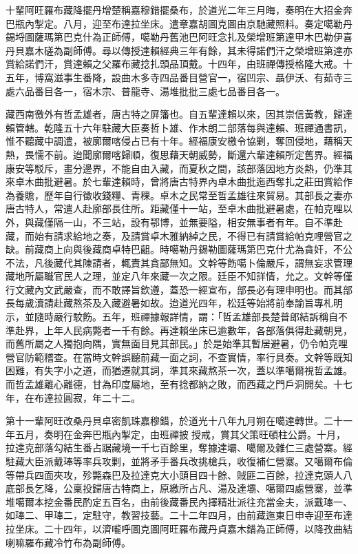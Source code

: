 \begin{pinyinscope}
十輩阿旺羅布藏降擺丹增楚稱嘉穆錯擺桑布，於道光二年三月晦，奏明在大招金奔巴瓶內掣定。八月，迎至布達拉坐床。遣章嘉胡圖克圖由京馳藏照料。奏定噶勒丹錫埒圖薩瑪第巴克什為正師傅，噶勒丹舊池巴阿旺念扎及榮增班第達甲木巴勒伊喜丹貝嘉木磋為副師傅。尋以傳授達賴經典三年有餘，其未得諾們汗之榮增班第達亦賞給諾們汗，賞達賴之父羅布藏捻扎頭品頂戴。十四年，由班禪傳授格隆大戒。十五年，博窩滋事生番降，設曲木多寺四品番目營官一，宿凹宗、聶伊沃、有茹寺三處六品番目各一，宿木宗、普龍寺、湯堆批批三處七品番目各一。

藏西南徼外有哲孟雄者，唐古特之屏籓也。自五輩達賴以來，因其崇信黃教，歸達賴管轄。乾隆五十六年駐藏大臣奏哲卜雄、作木朗二部落每與達賴、班禪通書訊，惟不聽藏中調遣，被廓爾喀侵占已有十年。經福康安檄令協剿，奪回侵地，藉稱天熱，畏懦不前。迨聞廓爾喀歸順，復思藉天朝威勢，斷還六輩達賴所定舊界。經福康安等駁斥，畫分邊界，不能自由入藏，而夏秋之間，該部落因地方炎熱，仍準其來卓木曲批避暑。於七輩達賴時，曾將唐古特界內卓木曲批迤西奪扎之莊田賞給作為養贍，歷年自行徵收錢糧、青稞。卓木之民常至哲孟雄往來貿易。其部長之妻亦唐古特人，常遣人赴廓部長住所。距藏僅十一站，至卓木曲批避暑處，在帕克哩以外，與藏僅隔一山，不三站，設有鄂博，並無要隘，相安無事者有年。自不準赴藏，而始有請求給地之奏，及請賞卓木雅納綽之民，不得已有請賞給帕克哩營官之缺。前藏商上向與後藏商卓特巴齟。時噶勒丹錫勒圖薩瑪第巴克什尤為貪奸，不公不法，凡後藏代其陳請者，輒責其貪鄙無知。文幹等飭噶卜倫嚴斥，謂無妄求管理藏地所屬職官民人之理，並定八年來藏一次之限。廷臣不知詳情，允之。文幹等僅行文藏內文武嚴查，而不敢譯旨欽遵，蓋恐一經宣布，部長必有理申明也。而其部長每歲瀆請赴藏熬茶及入藏避暑如故。迨道光四年，松廷等始將前奉諭旨專札明示，並隨時嚴行駮飭。五年，班禪據報詳情，謂：「哲孟雄部長楚普郎結訴稱自不準赴界，上年人民病斃者一千有餘。再達賴坐床已逾數年，各部落俱得赴藏朝見，而舊所屬之人獨抱向隅，實無面目見其部民。」於是始準其暫居避暑，仍令帕克哩營官防範稽查。在當時文幹誤聽前藏一面之詞，不查實情，率行具奏。文幹等既知困難，有失字小之道，而猶遷就其詞，準其來藏熬茶一次，蓋以準噶爾視哲孟雄。而哲孟雄離心離德，甘為印度屬地，至有捻都納之敗，而西藏之門戶洞開矣。十七年，在布達拉圓寂，年二十二。

第十一輩阿旺改桑丹貝卓密凱珠嘉穆錯，於道光十八年九月朔在噶達轉世。二十一年五月，奏明在金奔巴瓶內掣定，由班禪披授戒，賞其父策旺頓柱公爵。十月，拉達克部落勾結生番占踞藏境一千七百餘里，奪據達壩、噶爾及雜仁三處營寨。經駐藏大臣派戴琫等率兵攻剿，並將矛手番兵改挑槍兵，收復補仁營寨。又噶爾布倫等帶兵四面夾攻，殄斃森巴及拉達克大小頭目四十餘、賊匪二百餘，拉達克頭人八底部長乞降，公稟投歸唐古特商上，原繳所占凡、湯及達壩、噶爾四處營寨，並準堆噶爾本挖金番民酌定五百名，由前後藏番民內擇精壯派往充當金夫，派戴琫一、如琫二、甲琫二，定駐守，教習技藝。二十二年四月，由前藏迤東日申寺迎至布達拉坐床。二十四年，以濟嚨呼圖克圖阿旺羅布藏丹貞嘉木錯為正師傅，以降孜曲結喇嘛羅布藏冷竹布為副師傅。


\end{pinyinscope}
